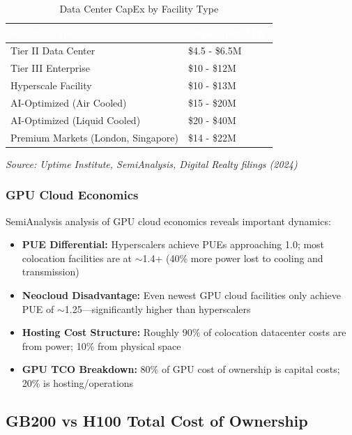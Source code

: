 \documentclass[11pt,a4paper]{article}
\newcommand{\source}[1]{\par\vspace{4pt}\centering\textit{\footnotesize\color{gray}Source: #1}\par\vspace{8pt}}
\begin{document}
\begin{table}[H]
\centering
\caption{Data Center CapEx by Facility Type}
\vspace{6pt}
\begin{tabular}{>{\raggedright\arraybackslash}p{7cm} >{\centering\arraybackslash}p{4cm}}
\toprule
\rowcolor{tableheader}
\textcolor{white}{\textbf{Facility Type}} & \textcolor{white}{\textbf{CapEx per MW}} \\
\midrule
Tier II Data Center & \$4.5 - \$6.5M \\
\rowcolor{lightgray}
Tier III Enterprise & \$10 - \$12M \\
Hyperscale Facility & \$10 - \$13M \\
\rowcolor{lightgray}
AI-Optimized (Air Cooled) & \$15 - \$20M \\
AI-Optimized (Liquid Cooled) & \$20 - \$40M \\
\rowcolor{lightgray}
Premium Markets (London, Singapore) & \$14 - \$22M \\
\bottomrule
\end{tabular}
\source{Uptime Institute, SemiAnalysis, Digital Realty filings (2024)}
\end{table}

\subsubsection{GPU Cloud Economics}

SemiAnalysis analysis of GPU cloud economics reveals important dynamics:

\begin{itemize}[leftmargin=*, itemsep=4pt]
    \item \textbf{PUE Differential:} Hyperscalers achieve PUEs approaching 1.0; most colocation facilities are at $\sim$1.4+ (40\% more power lost to cooling and transmission)
    \item \textbf{Neocloud Disadvantage:} Even newest GPU cloud facilities only achieve PUE of $\sim$1.25—significantly higher than hyperscalers
    \item \textbf{Hosting Cost Structure:} Roughly 90\% of colocation datacenter costs are from power; 10\% from physical space
    \item \textbf{GPU TCO Breakdown:} 80\% of GPU cost of ownership is capital costs; 20\% is hosting/operations
\end{itemize}

\subsection{GB200 vs H100 Total Cost of Ownership}
\end{document}
